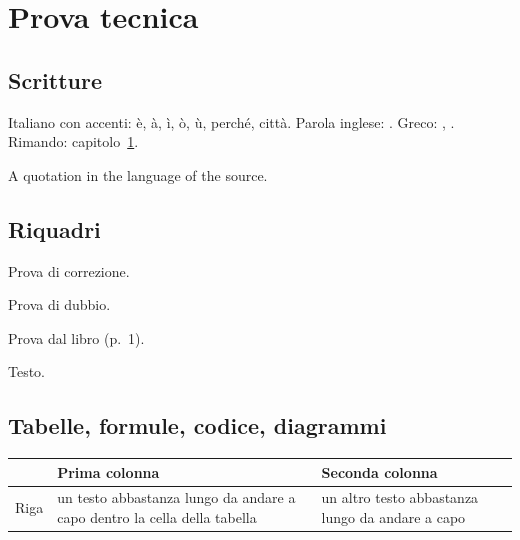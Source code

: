 \chapter{Prova tecnica}\label{cap:prova}

\section{Scritture}
Italiano con accenti: è, à, ì, ò, ù, perché, città. Parola inglese: .
Greco: , . Rimando: capitolo~\ref{cap:prova}.

\begin{cit}[english]
A quotation in the language of the source.
\end{cit}


\section{Riquadri}
\begin{correzione}Prova di correzione.\end{correzione}
\begin{dubbio}Prova di dubbio.\end{dubbio}
\begin{dallibro}Prova dal libro (p.~1).\end{dallibro}
\soloappunti
Testo. 

\section{Tabelle, formule, codice, diagrammi}
\begin{center}\small
\begin{tabularx}{\linewidth}{@{}lYY@{}}
\toprule
& \textbf{Prima colonna} & \textbf{Seconda colonna} \\
\midrule
Riga & un testo abbastanza lungo da andare a capo dentro la cella della tabella & un altro testo abbastanza lungo da andare a capo \\
\bottomrule
\end{tabularx}
\end{center}

